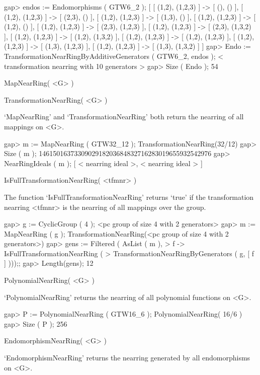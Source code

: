 \beginexample
    gap> endos := Endomorphisms ( GTW6_2 );
    [ [ (1,2), (1,2,3) ] -> [ (), () ], [ (1,2), (1,2,3) ] -> [ (2,3), () ],
      [ (1,2), (1,2,3) ] -> [ (1,3), () ], [ (1,2), (1,2,3) ] -> [ (1,2), () ],
      [ (1,2), (1,2,3) ] -> [ (2,3), (1,2,3) ],
      [ (1,2), (1,2,3) ] -> [ (2,3), (1,3,2) ],
      [ (1,2), (1,2,3) ] -> [ (1,2), (1,3,2) ],
      [ (1,2), (1,2,3) ] -> [ (1,2), (1,2,3) ],
      [ (1,2), (1,2,3) ] -> [ (1,3), (1,2,3) ],
      [ (1,2), (1,2,3) ] -> [ (1,3), (1,3,2) ] ]
    gap> Endo := TransformationNearRingByAdditiveGenerators ( GTW6_2, endos );
    < transformation nearring with 10 generators >
    gap> Size ( Endo );
    54
\endexample



\>MapNearRing( <G> )

\>TransformationNearRing( <G> )

`MapNearRing' and `TransformationNearRing' both return the nearring of all
mappings on <G>.

\beginexample
    gap> m := MapNearRing ( GTW32_12 );
    TransformationNearRing(32/12)
    gap> Size ( m );
    1461501637330902918203684832716283019655932542976
    gap> NearRingIdeals ( m );
    [ < nearring ideal >, < nearring ideal > ]
\endexample

\>IsFullTransformationNearRing( <tfmnr> )

The function `IsFullTransformationNearRing' returns `true' if the
transformation nearring <tfmnr> is the nearring of all mappings over
the group.

\beginexample
    gap> g := CyclicGroup ( 4 );
    <pc group of size 4 with 2 generators>
    gap> m := MapNearRing ( g );
    TransformationNearRing(<pc group of size 4 with 2 generators>)
    gap> gens := Filtered ( AsList ( m ), 
    >       f -> IsFullTransformationNearRing ( 
    >               TransformationNearRingByGenerators ( g, [ f ] )));;
    gap> Length(gens);
    12
\endexample

\>PolynomialNearRing( <G> )

`PolynomialNearRing' returns the nearring of all polynomial functions on <G>.

\beginexample
    gap> P := PolynomialNearRing ( GTW16_6 );
    PolynomialNearRing( 16/6 )
    gap> Size ( P );
    256
\endexample
    
\>EndomorphismNearRing( <G> )

`EndomorphismNearRing' returns the nearring generated by all endomorphisms
on <G>.

